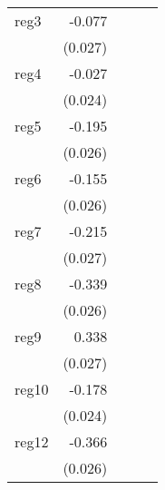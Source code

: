 {\begin{longtable}{l*{4}{D{.}{.}{-1}}}
\addlinespace
reg3        &      -0.077\sym{**} &                     &                     &                     \\
            &     (0.027)         &                     &                     &                     \\
\addlinespace
reg4        &      -0.027         &                     &                     &                     \\
            &     (0.024)         &                     &                     &                     \\
\addlinespace
reg5        &      -0.195\sym{***}&                     &                     &                     \\
            &     (0.026)         &                     &                     &                     \\
\addlinespace
reg6        &      -0.155\sym{***}&                     &                     &                     \\
            &     (0.026)         &                     &                     &                     \\
\addlinespace
reg7        &      -0.215\sym{***}&                     &                     &                     \\
            &     (0.027)         &                     &                     &                     \\
\addlinespace
reg8        &      -0.339\sym{***}&                     &                     &                     \\
            &     (0.026)         &                     &                     &                     \\
\addlinespace
reg9        &       0.338\sym{***}&                     &                     &                     \\
            &     (0.027)         &                     &                     &                     \\
\addlinespace
reg10       &      -0.178\sym{***}&                     &                     &                     \\
            &     (0.024)         &                     &                     &                     \\
\addlinespace
reg12       &      -0.366\sym{***}&                     &                     &                     \\
            &     (0.026)         &                     &                     &                     \\

\end{longtable}}
